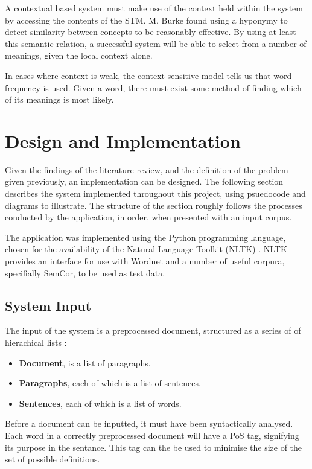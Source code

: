 \documentclass[]{article}
\begin{document}
A contextual based system must make use of the context held within the system by accessing the contents of the STM.  M. Burke found using a hyponymy to detect similarity between concepts to be reasonably effective. By using at least this semantic relation, a successful system will be able to select from a number of meanings, given the local context alone.

In cases where context is weak, the context-sensitive model tells us that word frequency is used. Given a word, there must exist some method of finding which of its meanings is most likely. 








\section{Design and Implementation}
\label{sec:Implementation}
Given the findings of the literature review, and the definition of the problem given previously, an implementation can be designed. The following section describes the system implemented throughout this project, using psuedocode and diagrams to illustrate. The structure of the section roughly follows the processes conducted by the application, in order, when presented with an input corpus.

The application was implemented using the Python programming language, chosen for the availability of the Natural Language Toolkit (NLTK) \cite{NLTK}. NLTK provides an interface for use with Wordnet and a number of useful corpura, specifially SemCor, to be used as test data.

\subsection{System Input}
\label{sec:CorpusAnalysis}
The input of the system is a preprocessed document, structured as a series of of hierachical lists \cite{NLTK}:

\begin{itemize}
	\item \textbf{Document}, is a list of paragraphs.
	\item \textbf{Paragraphs}, each of which is a list of sentences.
	\item \textbf{Sentences}, each of which is a list of words.
\end{itemize}

Before a document can be inputted, it must have been syntactically analysed. Each word in a correctly preprocessed document will have a PoS tag, signifying its purpose in the sentance. This tag can the be used to minimise the size of the set of possible definitions.
\end{document}
